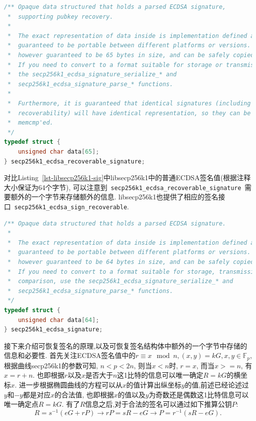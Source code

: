 \documentclass{article}
\newcommand{\F}{\mathbb{F}}
\newcommand{\code}[1]{\lstinline!#1!}
\begin{document}
\begin{lstlisting}[language=c, caption = libsecp256k1中的\textsf{secp256k1_ecdsa_recoverable_signature}, label=lst-libsecp256k1-rsig]
/** Opaque data structured that holds a parsed ECDSA signature,
 *  supporting pubkey recovery.
 *
 *  The exact representation of data inside is implementation defined and not
 *  guaranteed to be portable between different platforms or versions. It is
 *  however guaranteed to be 65 bytes in size, and can be safely copied/moved.
 *  If you need to convert to a format suitable for storage or transmission, use
 *  the secp256k1_ecdsa_signature_serialize_* and
 *  secp256k1_ecdsa_signature_parse_* functions.
 *
 *  Furthermore, it is guaranteed that identical signatures (including their
 *  recoverability) will have identical representation, so they can be
 *  memcmp'ed.
 */
typedef struct {
    unsigned char data[65];
} secp256k1_ecdsa_recoverable_signature;
\end{lstlisting}

对比Listing~\ref{lst-libsecp256k1-sig}中libsecp256k1中的普通ECDSA签名值(根据注释大小保证为64个字节),
可以注意到~\code{secp256k1_ecdsa_recoverable_signature}~需要额外的一个字节来存储额外的信息.
libsecp256k1也提供了相应的签名接口~\code{secp256k1_ecdsa_sign_recoverable}.

\begin{lstlisting}[language=c, caption = libsecp256k1中的\textsf{secp256k1_ecdsa_signature}, label=lst-libsecp256k1-sig]
/** Opaque data structured that holds a parsed ECDSA signature.
 *
 *  The exact representation of data inside is implementation defined and not
 *  guaranteed to be portable between different platforms or versions. It is
 *  however guaranteed to be 64 bytes in size, and can be safely copied/moved.
 *  If you need to convert to a format suitable for storage, transmission, or
 *  comparison, use the secp256k1_ecdsa_signature_serialize_* and
 *  secp256k1_ecdsa_signature_parse_* functions.
 */
typedef struct {
    unsigned char data[64];
} secp256k1_ecdsa_signature;
\end{lstlisting}

接下来介绍可恢复签名的原理,以及可恢复签名结构体中额外的一个字节中存储的信息和必要性.
首先关注ECDSA签名值中的$r \equiv x \mod n, (x, y) = kG, x, y \in \F_p$, 根据曲线secp256k1的参数可知,
$n < p < 2n$, 则当$x < n$时, $r = x$, 而当$x >= n$, 有$x = r + n$. 
也即根据$r$以及$x$是否大于$n$这1比特的信息可以唯一确定$R = kG$的横坐标$x$.
进一步根据椭圆曲线的方程可以从$x$的值计算出纵坐标$y$的值,前述已经论述过$y$和$-y$都是对应$x$的合法值,
也即根据$x$的值以及$y$为奇数还是偶数这1比特信息可以唯一确定点$R = kG$.
有了$R$信息之后,对于合法的签名可以通过如下推算公钥$P$:
$$
R = s^{-1}(eG+rP) \rightarrow rP = sR - eG \rightarrow P = r^{-1}(sR-eG).
$$
\end{document}
